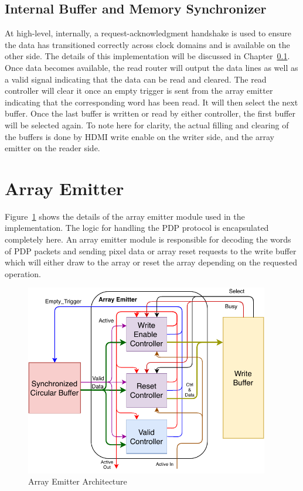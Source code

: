    \subsection{Internal Buffer and Memory Synchronizer}
        \label{Sec:MemorySync}
        At high-level, internally, a request-acknowledgment handshake is used to ensure the data has transitioned correctly across clock domains and is available on the other side. The details of this implementation will be discussed in Chapter~\ref{Sec:MemorySync}. Once data becomes available, the read router will output the data lines as well as a valid signal indicating that the data can be read and cleared. The read controller will clear it once an empty trigger is sent from the array emitter indicating that the corresponding word has been read. It will then select the next buffer. Once the last buffer is written or read by either controller, the first buffer will be selected again. To note here for clarity, the actual filling and clearing of the buffers is done by HDMI write enable on the writer side, and the array emitter on the reader side.


\section{Array Emitter}

    Figure~\ref{fig:ae_arch} shows the details of the array emitter module used in the implementation. The logic for handling the PDP protocol is encapsulated completely here. An array emitter module is responsible for decoding the words of PDP packets and sending pixel data or array reset requests to the write buffer which will either draw to the array or reset the array depending on the requested operation.

    \begin{figure}[t]
        \centering
        \includegraphics[width=0.95\textwidth]{fig/pdp_ae_arch.pdf}
        \caption{Array Emitter Architecture}
        \label{fig:ae_arch}
    \end{figure}

